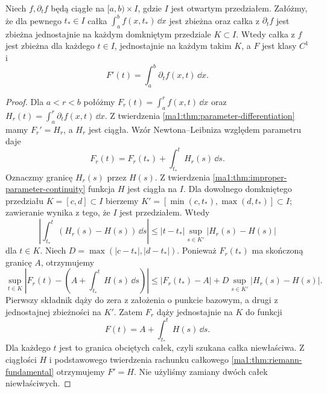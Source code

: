 \begin{twierdzenie}
\label{ma1:thm:improper-parameter-differentiation}
Niech $f,\partial_t f$ będą ciągłe na $[a,b)\times I$, gdzie $I$ jest otwartym przedziałem. Załóżmy, że dla pewnego $t_*\in I$ całka $\int_a^b f(x,t_*)\,\dd x$ jest zbieżna oraz całka z $\partial_t f$ jest zbieżna jednostajnie na każdym domkniętym przedziale $K\subset I$. Wtedy całka z $f$ jest zbieżna dla każdego $t\in I$, jednostajnie na każdym takim $K$, a $F$ jest klasy $C^1$ i
\[
 F'(t)=\int_a^b\partial_t f(x,t)\,\dd x.
\]
\end{twierdzenie}
\begin{proof}
Dla $a<r<b$ połóżmy
$F_r(t)=\int_a^r f(x,t)\,\dd x$ oraz
$H_r(t)=\int_a^r\partial_t f(x,t)\,\dd x$.
Z twierdzenia \ref{ma1:thm:parameter-differentiation} mamy $F_r'=H_r$, a $H_r$ jest ciągła. Wzór Newtona--Leibniza względem parametru daje
\[
 F_r(t)=F_r(t_*)+\int_{t_*}^t H_r(s)\,\dd s.
\]
Oznaczmy granicę $H_r(s)$ przez $H(s)$. Z twierdzenia \ref{ma1:thm:improper-parameter-continuity} funkcja $H$ jest ciągła na $I$. Dla dowolnego domkniętego przedziału $K=[c,d]\subset I$ bierzemy $K'=[\min(c,t_*),\max(d,t_*)]\subset I$; zawieranie wynika z tego, że $I$ jest przedziałem. Wtedy
\[
 \left|\int_{t_*}^t(H_r(s)-H(s))\,\dd s\right|
 \le |t-t_*|\sup_{s\in K'}|H_r(s)-H(s)|
\]
dla $t\in K$. Niech $D=\max(|c-t_*|,|d-t_*|)$. Ponieważ $F_r(t_*)$ ma skończoną granicę $A$, otrzymujemy
\[
 \sup_{t\in K}\left|F_r(t)-\left(A+\int_{t_*}^t H(s)\,\dd s\right)\right|
 \le |F_r(t_*)-A|+D\sup_{s\in K'}|H_r(s)-H(s)|.
\]
Pierwszy składnik dąży do zera z założenia o punkcie bazowym, a drugi z jednostajnej zbieżności na $K'$. Zatem $F_r$ dąży jednostajnie na $K$ do funkcji
\[
 F(t)=A+\int_{t_*}^t H(s)\,\dd s.
\]
Dla każdego $t$ jest to granica obciętych całek, czyli szukana całka niewłaściwa. Z ciągłości $H$ i podstawowego twierdzenia rachunku całkowego \ref{ma1:thm:riemann-fundamental} otrzymujemy $F'=H$. Nie użyliśmy zamiany dwóch całek niewłaściwych.
\end{proof}

